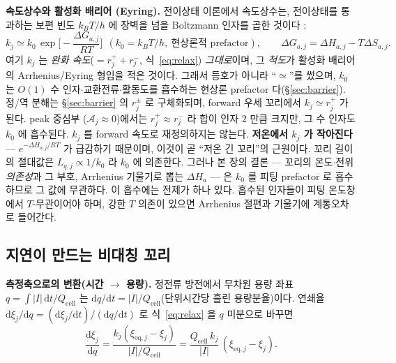 \documentclass[11pt,a4paper]{article}
\newcommand{\dd}{\mathrm{d}}
\newcommand{\eq}{\mathrm{eq}}
\newcommand{\cell}{\mathrm{cell}}
\begin{document}
\textbf{속도상수와 활성화 배리어 (Eyring).} 전이상태 이론에서 속도상수는, 전이상태를 통과하는 보편 빈도
$k_BT/h$ 에 장벽을 넘을 Boltzmann 인자를 곱한 것이다 \cite{eyring1935}:
\begin{equation}
k_j\simeq k_0\,\exp\!\Big[-\frac{\Delta G_{a,j}}{RT}\Big]\ \ (k_0=k_BT/h,\ \text{현상론적 prefactor}),\qquad \Delta G_{a,j}=\Delta H_{a,j}-T\Delta S_{a,j}.
\label{eq:eyring}
\end{equation}
여기 $k_j$ 는 \emph{완화 속도}($=r_j^++r_j^-$, 식~\eqref{eq:relax}) \emph{그대로}이며, 그 \emph{척도}가 활성화 배리어의
Arrhenius/Eyring 형임을 적은 것이다. 그래서 등호가 아니라 ``$\simeq$''를 썼으며, $k_0$ 는 $O(1)$ 수
인자$\cdot$교환전류$\cdot$활동도를 흡수하는 현상론 prefactor 다(\S\ref{sec:barrier}). 정/역 분해는
\S\ref{sec:barrier} 의 $r_j^\pm$ 로 구체화되며, forward 우세 꼬리에서 $k_j\simeq r_j^+$ 가 된다. peak 중심부
($\mathcal A_j\approx0$)에서는 $r_j^+\approx r_j^-$ 라 합이 인자 $2$ 만큼 크지만, 그 수 인자도 $k_0$ 에
흡수된다. $k_j$ 를 forward 속도로 재정의하지는 않는다.
\textbf{저온에서 $k_j$ 가 작아진다} — $e^{-\Delta H_{a,j}/RT}$ 가 급감하기 때문이며, 이것이 곧 ``저온 긴
꼬리''의 근원이다. 꼬리 길이의 절대값은 $L_{q,j}\propto1/k_0$ 라 $k_0$ 에 의존한다. 그러나 본 장의 결론 — 꼬리의
온도$\cdot$전위 \emph{의존성}과 그 부호, Arrhenius 기울기로 뽑는 $\Delta H_a$ — 은 $k_0$ 를 피팅 prefactor 로
흡수하므로 그 값에 무관하다. 이 흡수에는 전제가 하나 있다. 흡수된 인자들이 피팅 온도창에서 $T$-무관이어야 하며,
강한 $T$ 의존이 있으면 Arrhenius 절편과 기울기에 계통오차로 들어간다.

\subsection{지연이 만드는 비대칭 꼬리}
\textbf{측정축으로의 변환(시간 $\to$ 용량).} 정전류 방전에서 무차원 용량 좌표 $q=\int|I|\,\dd t/Q_\cell$ 는
$\dd q/\dd t=|I|/Q_\cell$(단위시간당 흘린 용량분율)이다. 연쇄율 $\dd\xi_j/\dd q=(\dd\xi_j/\dd t)/(\dd q/\dd t)$ 로
식~\eqref{eq:relax} 을 $q$ 미분으로 바꾸면
\begin{equation}
\frac{\dd\xi_j}{\dd q}=\frac{k_j(\xi_{\eq,j}-\xi_j)}{|I|/Q_\cell}=\frac{Q_\cell\,k_j}{|I|}\,(\xi_{\eq,j}-\xi_j).
\label{eq:dxidq}
\end{equation}
\end{document}
